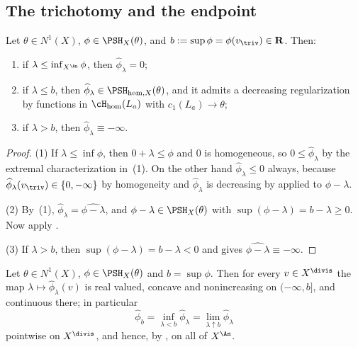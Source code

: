 \subsection{The trichotomy and the endpoint}
\label{sec:ch35-trichotomy}

\begin{proposition}
\label{prop:ch35-slice-trichotomy}
Let $\theta\in N^1(X)$, $\phi\in\PSH_X(\theta)$, and
$b:=\sup\phi=\phi(v_{\triv})\in\mathbf R$.  Then:
\begin{enumerate}
\item if $\lambda\leq\inf_{X^{\An}}\phi$, then $\widehat\phi_\lambda=0$;
\item if $\lambda\leq b$, then
 $\widehat\phi_\lambda\in\PSH_{\mathrm{hom},X}(\theta)$, and it admits a
 decreasing regularization by functions in $\cH_{\mathrm{hom}}(L_a)$ with
 $c_1(L_a)\to\theta$;
\item if $\lambda>b$, then $\widehat\phi_\lambda\equiv-\infty$.
\end{enumerate}
\par
\end{proposition}

\begin{proof}
(1)  If $\lambda\leq\inf\phi$, then $0+\lambda\leq\phi$ and $0$ is
homogeneous, so $0\leq\widehat\phi_\lambda$ by the extremal
characterization in \,(1).  On the other hand
$\widehat\phi_\lambda\leq0$ always, because
$\widehat\phi_\lambda(v_{\triv})\in\{0,-\infty\}$ by homogeneity and
$\widehat\phi_\lambda$ is decreasing by
 applied to $\phi-\lambda$.

(2)  By \,(1),
$\widehat\phi_\lambda=\widehat{\phi-\lambda}$, and
$\phi-\lambda\in\PSH_X(\theta)$ with
$\sup(\phi-\lambda)=b-\lambda\geq0$.  Now apply
.

(3)  If $\lambda>b$, then $\sup(\phi-\lambda)=b-\lambda<0$ and
 gives
$\widehat{\phi-\lambda}\equiv-\infty$.
\end{proof}

\begin{lemma}
\label{lem:ch35-slice-continuity}
Let $\theta\in N^1(X)$, $\phi\in\PSH_X(\theta)$ and $b=\sup\phi$.
Then for every $v\in X^{\divis}$ the map
$\lambda\mapsto\widehat\phi_\lambda(v)$ is real valued, concave and
nonincreasing on $(-\infty,b]$, and continuous there; in particular
\begin{equation}
\label{eq:ch35-endpoint-continuity}
 \widehat\phi_b=\inf_{\lambda<b}\widehat\phi_\lambda
 =\lim_{\lambda\uparrow b}\widehat\phi_\lambda
\end{equation}
pointwise on $X^{\divis}$, and hence, by
, on all of $X^{\An}$.
\end{lemma}

